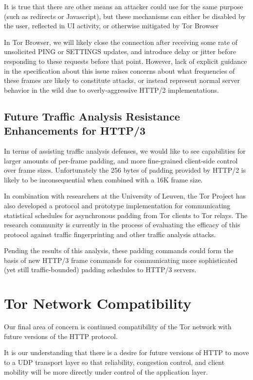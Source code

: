 \documentclass[letterpaper,11pt]{llncs}
\begin{document}
It is true that there are other means an attacker could use for the same
purpose (such as redirects or Javascript), but these mechanisms can either be
disabled by the user, reflected in UI activity, or otherwise mitigated by Tor
Browser

In Tor Browser, we will likely close the connection after receiving some rate
of unsolicited PING or SETTINGS updates, and introduce delay or jitter before
responding to these requests before that point. However, lack of explicit
guidance in the specification about this issue raises concerns about what
frequencies of these frames are likely to constitute attacks, or instead
represent normal server behavior in the wild due to overly-aggressive HTTP/2
implementations.

\subsection{Future Traffic Analysis Resistance Enhancements for HTTP/3}

In terms of assisting traffic analysis defenses, we would like to see
capabilities for larger amounts of per-frame padding, and more fine-grained
client-side control over frame sizes. Unfortunately the 256 bytes of padding
provided by HTTP/2 is likely to be inconsequential when combined with a 16K
frame size.

In combination with researchers at the University of Leuven, the Tor Project
has also developed a protocol and prototype implementation for communicating
statistical schedules for asynchronous padding from Tor clients to Tor relays.
The research community is currently in the process of evaluating the efficacy
of this protocol against traffic fingerprinting and other traffic analysis
attacks.

Pending the results of this analysis, these padding commands could form the
basis of new HTTP/3 frame commands for communicating more sophisticated (yet
still traffic-bounded) padding schedules to HTTP/3 servers.


\section{Tor Network Compatibility}

Our final area of concern is continued compatibility of the Tor network with
future versions of the HTTP protocol.

It is our understanding that there is a desire for future versions of HTTP to
move to a UDP transport layer so that reliability, congestion control, and
client mobility will be more directly under control of the application layer.
\end{document}

